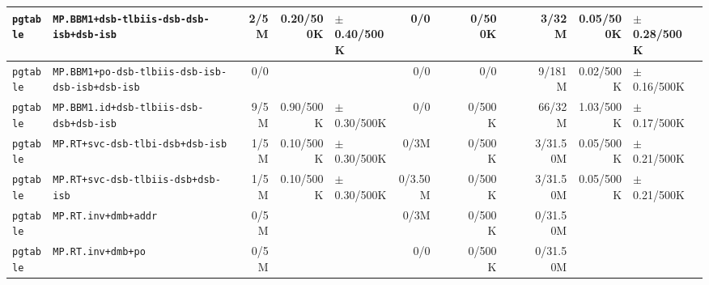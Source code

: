 \begin{tabular}{l l  | r r l | r r l | r r l | r r l l}
     \verb|pgtable| &              \verb|MP.BBM1+dsb-tlbiis-dsb-dsb-isb+dsb-isb| &           2/5M &             0.20/500K &   $\pm$ 0.40/500K &            0/0 &                       &                 &         0/500K &                       &                   &          3/32M &             0.05/500K &   $\pm$ 0.28/500K & \\ \hline 
     \verb|pgtable| &       \verb|MP.BBM1+po-dsb-tlbiis-dsb-isb-dsb-isb+dsb-isb| &            0/0 &                       &                   &            0/0 &                       &                 &            0/0 &                       &                   &         9/181M &             0.02/500K &   $\pm$ 0.16/500K & \\ \hline 
     \verb|pgtable| &               \verb|MP.BBM1.id+dsb-tlbiis-dsb-dsb+dsb-isb| &           9/5M &             0.90/500K &   $\pm$ 0.30/500K &            0/0 &                       &                 &         0/500K &                       &                   &         66/32M &             1.03/500K &   $\pm$ 0.17/500K & \\ \hline 
     \verb|pgtable| &                      \verb|MP.RT+svc-dsb-tlbi-dsb+dsb-isb| &           1/5M &             0.10/500K &   $\pm$ 0.30/500K &           0/3M &                       &                 &         0/500K &                       &                   &       3/31.50M &             0.05/500K &   $\pm$ 0.21/500K & \\ \hline 
     \verb|pgtable| &                    \verb|MP.RT+svc-dsb-tlbiis-dsb+dsb-isb| &           1/5M &             0.10/500K &   $\pm$ 0.30/500K &        0/3.50M &                       &                 &         0/500K &                       &                   &       3/31.50M &             0.05/500K &   $\pm$ 0.21/500K & \\ \hline 
     \verb|pgtable| &                                  \verb|MP.RT.inv+dmb+addr| &           0/5M &                       &                   &           0/3M &                       &                 &         0/500K &                       &                   &       0/31.50M &                       &                   & \\ \hline 
     \verb|pgtable| &                                    \verb|MP.RT.inv+dmb+po| &           0/5M &                       &                   &            0/0 &                       &                 &         0/500K &                       &                   &       0/31.50M &                       &                   & \\ \hline 

\end{tabular}
